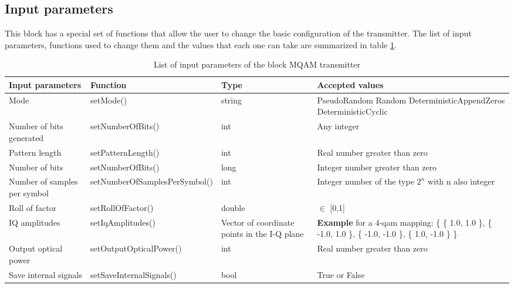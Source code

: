 \begin{itemize}
\subsection*{Input parameters}

This block has a special set of functions that allow the user to change the basic configuration of the transmitter. The list of input parameters, functions used to change them and the values that each one can take are summarized in table \ref{table}.

\begin{table}[h]
\begin{center}
	\begin{tabular}{| m{} | m{} |  m{} | m{4cm} | }
		\hline
		\textbf{Input parameters} & \textbf{Function} & Type & \textbf{Accepted values} \\ \hline
		Mode & setMode() & string & PseudoRandom \newline Random \newline DeterministicAppendZeros \newline DeterministicCyclic \\ \hline
		Number of bits generated & setNumberOfBits() & int & Any integer\\ \hline
		Pattern length & setPatternLength() & int & Real number greater than zero\\ \hline
		Number of bits & setNumberOfBits() & long & Integer number greater than zero\\ \hline
		Number of samples per symbol & setNumberOfSamplesPerSymbol() & int & Integer number of the type $2^n$ with n also integer\\ \hline
		Roll of factor & setRollOfFactor() & double & $\in$ [0,1] \\ \hline
		IQ amplitudes & setIqAmplitudes() & Vector of coordinate points in the I-Q plane & \textbf{Example} for a 4-qam mapping: \{ \{ 1.0, 1.0 \}, \{ -1.0, 1.0 \}, \{ -1.0, -1.0 \}, \{ 1.0, -1.0 \} \} \\ \hline
		Output optical power & setOutputOpticalPower() & int & Real number greater than zero\\ \hline
		Save internal signals & setSaveInternalSignals() & bool & True or False\\
		\hline
	\end{tabular}
	\caption{List of input parameters of the block MQAM transmitter} \label{table}
\end{center}
\end{table}


\end{itemize}
